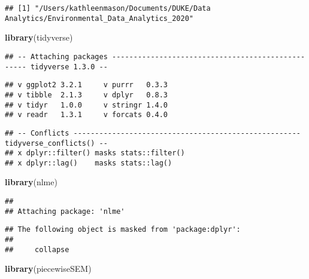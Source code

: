 \documentclass[]{article}
\newenvironment{Shaded}{\begin{snugshade}}{\end{snugshade}}
\newcommand{\CommentTok}[1]{\textcolor[rgb]{0.56,0.35,0.01}{\textit{#1}}}
\newcommand{\KeywordTok}[1]{\textcolor[rgb]{0.13,0.29,0.53}{\textbf{#1}}}
\newcommand{\NormalTok}[1]{#1}
\begin{document}
\begin{Shaded}
\end{Shaded}

\begin{verbatim}
## [1] "/Users/kathleenmason/Documents/DUKE/Data Analytics/Environmental_Data_Analytics_2020"
\end{verbatim}

\begin{Shaded}
\begin{Highlighting}[]
\KeywordTok{library}\NormalTok{(tidyverse)}
\end{Highlighting}
\end{Shaded}

\begin{verbatim}
## -- Attaching packages -------------------------------------------------- tidyverse 1.3.0 --
\end{verbatim}

\begin{verbatim}
## v ggplot2 3.2.1     v purrr   0.3.3
## v tibble  2.1.3     v dplyr   0.8.3
## v tidyr   1.0.0     v stringr 1.4.0
## v readr   1.3.1     v forcats 0.4.0
\end{verbatim}

\begin{verbatim}
## -- Conflicts ----------------------------------------------------- tidyverse_conflicts() --
## x dplyr::filter() masks stats::filter()
## x dplyr::lag()    masks stats::lag()
\end{verbatim}

\begin{Shaded}
\begin{Highlighting}[]
\KeywordTok{library}\NormalTok{(nlme)}
\end{Highlighting}
\end{Shaded}

\begin{verbatim}
## 
## Attaching package: 'nlme'
\end{verbatim}

\begin{verbatim}
## The following object is masked from 'package:dplyr':
## 
##     collapse
\end{verbatim}

\begin{Shaded}
\begin{Highlighting}[]
\KeywordTok{library}\NormalTok{(piecewiseSEM)}
\end{Highlighting}
\end{Shaded}
\end{document}
